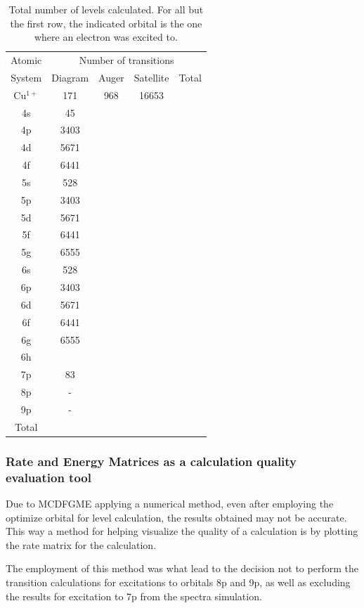 \begin{table}[h!]
    \centering
    \caption{Total number of levels calculated. For all but the first row, the indicated orbital is the one where an electron was excited to.}
    \label{tab:tot_trans}
    \begin{tabular}{c||c|c|c||c}
        \toprule Atomic&\multicolumn{4}{c}{Number of transitions}\\
        System&Diagram&Auger&Satellite&Total\\
        \midrule
        Cu$^{1+}$ & 171 &968&16653\\ 
        4s& 45 \\
        4p & 3403 &\\
        4d & 5671 &\\
        4f & 6441\\
        5s & 528\\
        5p & 3403\\
        5d & 5671\\
        5f & 6441\\
        5g & 6555\\
        6s & 528\\
        6p & 3403\\
        6d & 5671\\
        6f & 6441\\
        6g & 6555\\
        6h\\
        7p & 83\\
        8p & -\\
        9p & -\\
        \midrule
        Total\\
        \bottomrule
    \end{tabular}
\end{table}


\subsubsection{Rate and Energy Matrices as a calculation quality evaluation tool}

Due to \gls{MCDFGME} applying a numerical method, even after employing the optimize orbital for level calculation, the results obtained may not be accurate. This way a method for helping visualize the quality of a calculation is by plotting the rate matrix for the calculation.

The employment of this method was what lead to the decision not to perform the transition calculations for excitations to orbitals 8p and 9p, as well as excluding the results for excitation to 7p from the spectra simulation.

